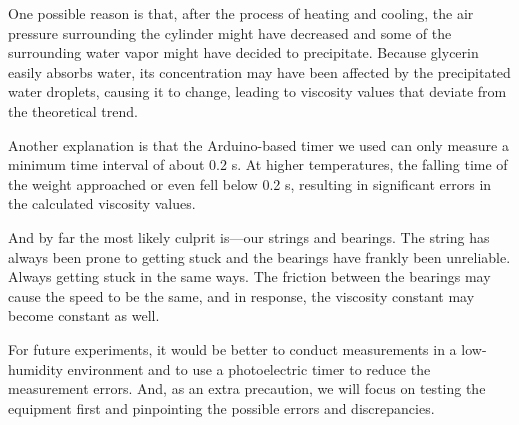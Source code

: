 \documentclass[12pt]{article}
\begin{document}
One possible reason is that, after the process of heating and cooling, the air pressure surrounding the cylinder might  have decreased and some of the surrounding water vapor might have  decided to precipitate. Because glycerin easily absorbs water, its concentration may have been affected by the precipitated water droplets, causing it to change, leading to viscosity values that deviate from the theoretical trend.

Another explanation is that the Arduino-based timer we used can only measure a minimum time interval of about 0.2 s. At higher temperatures, the falling time of the weight approached or even fell below 0.2 s, resulting in significant errors in the calculated viscosity values.

And by far the most likely culprit is—our strings and bearings. The string has always been prone to getting stuck and the bearings have frankly been unreliable. Always getting stuck in the same ways. The friction between the bearings may cause the speed to be the same, and in response, the viscosity constant may become constant as well.

For future experiments, it would be better to conduct measurements in a low-humidity environment and to use a photoelectric timer to reduce the measurement errors. And, as an extra precaution, we will focus on testing the equipment first and pinpointing the possible errors and discrepancies.



\end{document}
